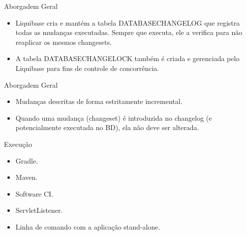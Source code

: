 \begin{frame}[c]{Aborgadem Geral}
\begin{itemize}
        \item Liquibase cria e mantém a tabela DATABASECHANGELOG que registra todas as mudanças executadas. Sempre que executa, ele a verifica para não reaplicar os mesmos changesets.
        \item A tabela DATABASECHANGELOCK também é criada e gerenciada pelo Liquibase para fins de controle de concorrência.
\end{itemize}

\begin{center}
\end{center}
\end{frame}

\begin{frame}[c]{Aborgadem Geral}
\begin{itemize}
    \item Mudanças descritas de forma estritamente incremental.
    \item Quando uma mudança (changeset) é introduzida no changelog (e potencialmente executada no BD), \textcolor{ALERT}{ela não deve ser alterada.}
\end{itemize}
\begin{center}
\end{center}
\end{frame}

\begin{frame}[c]{Execução}
\begin{itemize}
    \item Gradle.
    \item Maven.
    \item Software CI.
    \item \textcolor{ALERT}{ServletListener}.
    \item \textcolor{ALERT}{Linha de comando com a aplicação stand-alone}.
\end{itemize}
\begin{center}
\end{center}

\end{frame}

